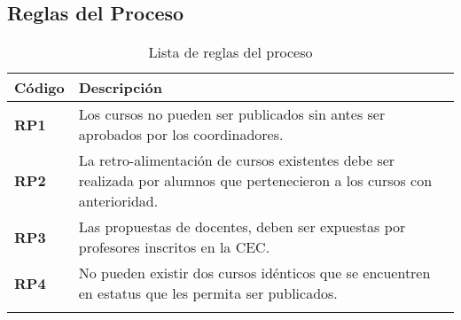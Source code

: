 \subsection{Reglas del Proceso}
\begin{longtable}{p{5cm}|p{11cm}}%
		\hline
			\textbf{Código} & \textbf{Descripción}\\
		\hline\hline
			{{\color{blue}\textbf{RP1}}} & {Los cursos no pueden ser publicados sin antes ser aprobados por los coordinadores.}\\ %
			\hline
			{{\color{blue}\textbf{RP2}}}  & {La retro-alimentación de cursos existentes debe ser realizada por alumnos que pertenecieron a los cursos con anterioridad.}\\
		\hline
			{{\color{blue}\textbf{RP3}}}  & {Las propuestas de docentes, deben ser expuestas por profesores inscritos en la CEC.}\\
		\hline
			{{\color{blue}\textbf{RP4}}}  & {No pueden existir dos cursos idénticos que se encuentren en estatus que les permita ser publicados.}\\
		\hline
\caption{Lista de reglas del proceso}
\end{longtable}

